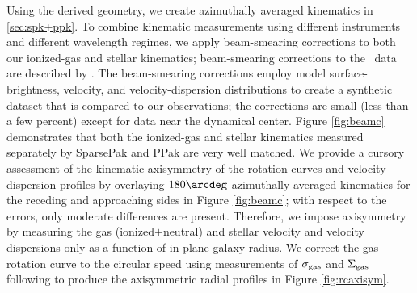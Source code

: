 \documentclass[apj,iop,numberedappendix]{emulateapj}
\begin{document}
Using the derived geometry, we create azimuthally averaged kinematics in \sect
\ref{sec:spk+ppk}.  To combine kinematic measurements using different
instruments and different wavelength regimes, we apply beam-smearing corrections
to both our ionized-gas and stellar kinematics; beam-smearing corrections to the
\hone\ data are described by \citet{TPKMPhD}.  The beam-smearing corrections
employ model surface-brightness, velocity, and velocity-dispersion distributions
to create a synthetic dataset that is compared to our observations; the
corrections are small (less than a few percent) except for data near the
dynamical center.  Figure \ref{fig:beamc} demonstrates that both the ionized-gas
and stellar kinematics measured separately by SparsePak and PPak are very well
matched.  We provide a cursory assessment of the kinematic axisymmetry of the
rotation curves and velocity dispersion profiles by overlaying $180\arcdeg$
azimuthally averaged kinematics for the receding and approaching sides in Figure
\ref{fig:beamc}; with respect to the errors, only moderate differences are
present.  Therefore, we impose axisymmetry by measuring the gas
(ionized$+$neutral) and stellar velocity and velocity dispersions only as a
function of in-plane galaxy radius.  We correct the gas rotation curve to the
circular speed using measurements of $\sigma_{\rm gas}$ and $\Sigma_{\rm gas}$ following
\citet{2010ApJ...721..547D} to produce the axisymmetric radial profiles in
Figure \ref{fig:rcaxisym}.
\end{document}

